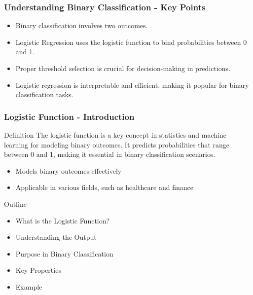 \documentclass[aspectratio=169]{beamer}
\begin{document}
\begin{frame}[fragile]
    \frametitle{Understanding Binary Classification - Key Points}
    \begin{itemize}
        \item Binary classification involves two outcomes.
        \item Logistic Regression uses the logistic function to bind probabilities between 0 and 1.
        \item Proper threshold selection is crucial for decision-making in predictions.
        \item Logistic regression is interpretable and efficient, making it popular for binary classification tasks.
    \end{itemize}
\end{frame}

\begin{frame}[fragile]
    \frametitle{Logistic Function - Introduction}
    \begin{block}{Definition}
        The logistic function is a key concept in statistics and machine learning for modeling binary outcomes. It predicts probabilities that range between 0 and 1, making it essential in binary classification scenarios.
    \end{block}
    
    \begin{itemize}
        \item Models binary outcomes effectively
        \item Applicable in various fields, such as healthcare and finance
    \end{itemize}
    
    \begin{block}{Outline}
        \begin{itemize}
            \item What is the Logistic Function?
            \item Understanding the Output
            \item Purpose in Binary Classification
            \item Key Properties
            \item Example
        \end{itemize}
    \end{block}
\end{frame}
\end{document}
